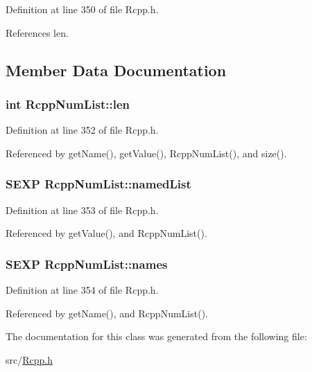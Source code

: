 Definition at line 350 of file Rcpp.h.

References len.

\subsection{Member Data Documentation}
\hypertarget{classRcppNumList_c4cb5c784f7105f0f28ae48d02deb3a1}{
\subsubsection[len]{\setlength{\rightskip}{0pt plus 5cm}int {\bf RcppNumList::len}}}
\label{classRcppNumList_c4cb5c784f7105f0f28ae48d02deb3a1}




Definition at line 352 of file Rcpp.h.

Referenced by getName(), getValue(), RcppNumList(), and size().\hypertarget{classRcppNumList_7464927aafe555a0c4a104247dba7185}{
\subsubsection[namedList]{\setlength{\rightskip}{0pt plus 5cm}SEXP {\bf RcppNumList::namedList}}}
\label{classRcppNumList_7464927aafe555a0c4a104247dba7185}




Definition at line 353 of file Rcpp.h.

Referenced by getValue(), and RcppNumList().\hypertarget{classRcppNumList_a669b28cba0c95531a3c92910a60ecb0}{
\subsubsection[names]{\setlength{\rightskip}{0pt plus 5cm}SEXP {\bf RcppNumList::names}}}
\label{classRcppNumList_a669b28cba0c95531a3c92910a60ecb0}




Definition at line 354 of file Rcpp.h.

Referenced by getName(), and RcppNumList().

The documentation for this class was generated from the following file:\begin{CompactItemize}
\item 
src/\hyperlink{Rcpp_8h}{Rcpp.h}\end{CompactItemize}
